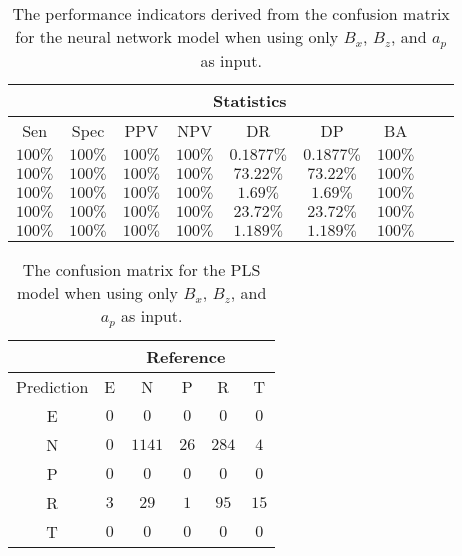 \begin{table}[!ht]
	\centering
	\begin{tabular}{|c|c|c|c|c|c|c|c|c|}
		\hline
		 & \multicolumn{7}{c|}{Statistics} \\ \hline
		Sen & Spec & PPV & NPV & DR & DP & BA \\ \hline
		$100\%$ & $100\%$ & $100\%$ & $100\%$ & $0.1877\%$ & $0.1877\%$ & $100\%$ \\ \hline
		$100\%$ & $100\%$ & $100\%$ & $100\%$ & $73.22\%$ & $73.22\%$ & $100\%$ \\ \hline
		$100\%$ & $100\%$ & $100\%$ & $100\%$ & $1.69\%$ & $1.69\%$ & $100\%$ \\ \hline
		$100\%$ & $100\%$ & $100\%$ & $100\%$ & $23.72\%$ & $23.72\%$ & $100\%$ \\ \hline
		$100\%$ & $100\%$ & $100\%$ & $100\%$ & $1.189\%$ & $1.189\%$ & $100\%$ \\ \hline
	\end{tabular}
	\caption{The performance indicators derived from the confusion matrix for the neural network model when using only $B_{x}$, $B_{z}$, and $a_{p}$ as input.}
	\label{tab:cs:xzap:nnet}
\end{table}

\begin{table}[!ht]
	\centering
	\begin{tabular}{|c|c|c|c|c|c|}
		\hline
		 & \multicolumn{5}{|c|}{Reference} \\ \hline
		 Prediction & E & N & P & R & T \\ \hline
		 E & $0$ & $0$ & $0$ & $0$ & $0$ \\ \hline
		 N & $0$ & $1141$ & $26$ & $284$ & $4$ \\ \hline
		 P & $0$ & $0$ & $0$ & $0$ & $0$ \\ \hline
		 R & $3$ & $29$ & $1$ & $95$ & $15$ \\ \hline
		 T & $0$ & $0$ & $0$ & $0$ & $0$ \\ \hline
	\end{tabular}
	\caption{The confusion matrix for the PLS model when using only $B_{x}$, $B_{z}$, and $a_{p}$ as input.}
	\label{tab:cm:xzap:pls}
\end{table}

